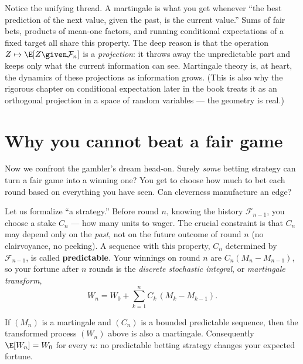 \begin{happeningbox}
Notice the unifying thread. A martingale is what you get whenever ``the best prediction of the next
value, given the past, is the current value.'' Sums of fair bets, products of mean-one factors, and
running conditional expectations of a fixed target all share this property. The deep reason is that the
operation $Z \mapsto \E[Z\given\mathcal{F}_n]$ is a \emph{projection}: it throws away the
unpredictable part and keeps only what the current information can see. Martingale theory is, at heart,
the dynamics of these projections as information grows. (This is also why the rigorous chapter on
conditional expectation later in the book treats it as an orthogonal projection in a space of random
variables --- the geometry is real.)
\end{happeningbox}

\section{Why you cannot beat a fair game}
\label{ch28:cannot-beat}

Now we confront the gambler's dream head-on. Surely \emph{some} betting strategy can turn a fair game
into a winning one? You get to choose how much to bet each round based on everything you have seen. Can
cleverness manufacture an edge?

Let us formalize ``a strategy.'' Before round $n$, knowing the history $\mathcal{F}_{n-1}$, you choose
a stake $C_n$ --- how many units to wager. The crucial constraint is that $C_n$ may depend only on the
\emph{past}, not on the future outcome of round $n$ (no clairvoyance, no peeking). A sequence with this
property, $C_n$ determined by $\mathcal{F}_{n-1}$, is called \textbf{predictable}. Your winnings on
round $n$ are $C_n(M_n - M_{n-1})$, so your fortune after $n$ rounds is the \emph{discrete stochastic
integral}, or \emph{martingale transform},
\[
  W_n = W_0 + \sum_{k=1}^{n} C_k\,(M_k - M_{k-1}).
\]

\begin{theorem}
\label{ch28:thm-transform}
If $(M_n)$ is a martingale and $(C_n)$ is a bounded predictable sequence, then the transformed process
$(W_n)$ above is also a martingale. Consequently $\E[W_n] = W_0$ for every $n$: no predictable betting
strategy changes your expected fortune.
\end{theorem}


